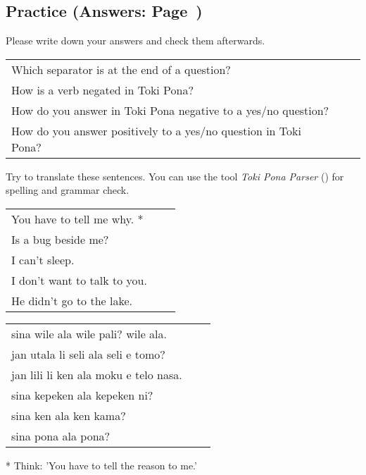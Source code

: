 %
%
\newpage
%
\subsection*{Practice (Answers: Page~\pageref{'negation_yes_no_questions'})}
%
Please write down your answers and check them afterwards. 

\begin{supertabular}{p{5,5cm}|ll}
Which separator is at the end of a question? &&  \\ %
How is a verb negated in Toki Pona? &&  \\ %
How do you answer in Toki Pona negative to a yes/no question? &&  \\ %
How do you answer positively to a yes/no question in Toki Pona? &&  \\ %
\end{supertabular} 

Try to translate these sentences. 
You can use the tool \textit{Toki Pona Parser} (\cite{www:rowa:02}) for spelling and grammar check. 

\begin{supertabular}{p{5,5cm}|ll}
You have to tell me why. *  &&   \\ %
Is a bug beside me?  &&    \\ %
I can't sleep.  &&    \\ %
I don't want to talk to you.  &&    \\ %
He didn't go to the lake.   &&   \\ %
\end{supertabular}

\begin{supertabular}{p{5,5cm}|ll}
sina wile ala wile pali? wile ala.  &&    \\ %
jan utala li seli ala seli e tomo?   &&   \\ %
jan lili li ken ala moku e telo nasa.   &&   \\ %
sina kepeken ala kepeken ni?  &&    \\ %
sina ken ala ken kama?   &&   \\ %
sina pona ala pona? &&   \\ %
\end{supertabular} 

* Think: 'You have to tell the reason to me.' 
